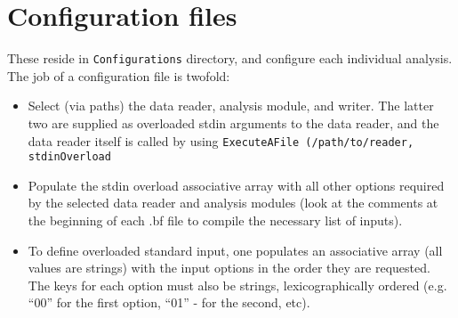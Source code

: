 \documentclass[12pt]{article}
\begin{document}
\section{Configuration files}
These reside in {\tt Configurations} directory, and configure each individual analysis. 
The job of a configuration file is twofold:

\begin{itemize}
\item Select (via paths) the data reader, analysis module, and writer. The latter two are supplied as overloaded stdin arguments to 
the data reader, and the data reader itself is called by using {\tt ExecuteAFile (/path/to/reader, stdinOverload}
\item Populate the stdin overload associative array with all other options required by the selected data reader and analysis modules
(look at the comments at the beginning of each .bf file to compile the necessary list of inputs). 
\item  

To define overloaded standard input, one populates an associative array (all values are strings) with the input options in the order they are
requested. The keys for each option must also be strings, lexicographically ordered (e.g. ``00'' for the first option, ``01'' - for the second, etc).

\end{itemize}
 
\end{document}
